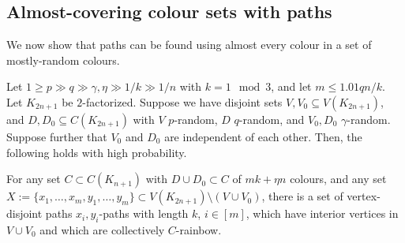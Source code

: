 



\subsection{Almost-covering colour sets with paths}
We now show that paths can be found using almost every colour in a set of mostly-random colours.
\begin{lemma}\label{finishingB}
Let $1\geq p\gg q\gg \gamma,\eta\gg  1/k \gg 1/n$ with $k=1\mod 3$,  and let $m\leq 1.01q n/k$. %
Let  $K_{2n+1}$ be $2$-factorized.
Suppose we have disjoint sets $V, V_0\subseteq V(K_{2n+1})$, and $D,D_0\subseteq C(K_{2n+1})$  with $V$ $p$-random, $D$ $q$-random, and $V_0, D_0$ $\gamma$-random. Suppose further that $V_0$ and $D_0$ are independent of each other. Then, the following holds with high probability.

For any set $C\subset C(K_{n+1})$ with $D\cup D_0\subset C$ of $mk+\eta n$ colours, and any set $X:=\{x_1,\ldots,x_m,y_1,\ldots,y_m\}\subset V(K_{2n+1})\setminus (V\cup V_0)$, there is a set of vertex-disjoint paths $x_i,y_i$-paths with length $k$, $i\in [m]$, which have interior vertices in $V\cup V_0$ and which are collectively $C$-rainbow.
\end{lemma}
